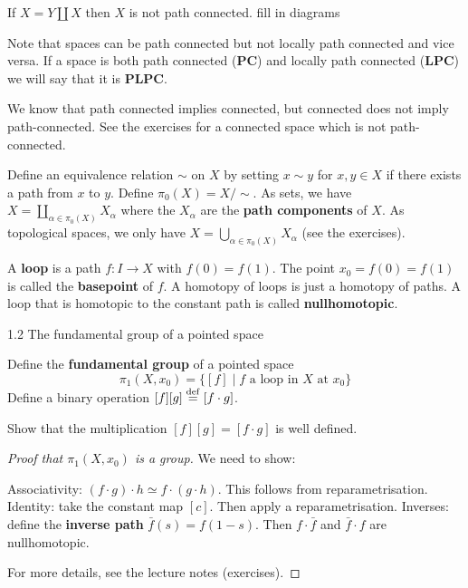 \begin{exam}
	\begin{enum}
		\io If $X = Y \amalg X$ then $X$ is not path connected.
		fill in diagrams
	\end{enum}
\end{exam}

\begin{rmk}
	Note that spaces can be path connected but not locally path connected and vice versa.
	If a space is both path connected (\textbf{PC}) and locally path connected (\textbf{LPC}) we will say that it is \textbf{PLPC}.
\end{rmk}

\begin{rmk}
	We know that path connected implies connected, but connected does not imply path-connected.
	See the exercises for a connected space which is not path-connected.
\end{rmk}

\begin{defn}
	Define an equivalence relation $\sim$ on $X$ by setting $x \sim y$ for $x,y \in X$ if there exists a path from $x$ to $y$.
	Define $\pi_0(X) = X/\sim$.
	As sets, we have $X = \coprod_{\alpha \in \pi_0(X)} X_\alpha$ where the $X_\alpha$ are the \textbf{path components} of $X$.
	As topological spaces, we only have $X = \bigcup_{\alpha \in \pi_0(X)} X_\alpha$ (see the exercises).
\end{defn}

\begin{defn}
	A \textbf{loop} is a path $f:I \to X$ with $f(0)=f(1)$.
	The point $x_0=f(0)=f(1)$ is called the \textbf{basepoint} of $f$.
	A homotopy of loops is just a homotopy of paths.
	A loop that is homotopic to the constant path is called \textbf{nullhomotopic}.
\end{defn}

1.2 The fundamental group of a pointed space

\begin{defn}
	Define the \textbf{fundamental group} of a pointed space
	\[\pi_1(X,x_0) = \{[f] \mid f \text{ a loop in } X \text{ at } x_0\}\]
	Define a binary operation $[f][g] \overset{\mathrm{def}}{=} [f \cdot g]$.
\end{defn}

\begin{exer}
	Show that the multiplication $[f][g] = [f \cdot g]$ is well defined.
\end{exer}

\begin{proof}[Proof that $\pi_1(X,x_0)$ is a group]
	We need to show:
	\begin{enum}
		\io Associativity: $(f \cdot g) \cdot h \simeq f \cdot (g \cdot h)$.
		This follows from reparametrisation.
		\io Identity: take the constant map $[c]$.
		Then apply a reparametrisation.
		\io Inverses: define the \textbf{inverse path} $\bar{f}(s) = f(1-s)$.
		Then $f \cdot \bar{f}$ and $\bar{f} \cdot f$ are nullhomotopic.
	\end{enum}
	For more details, see the lecture notes (exercises).
\end{proof}


